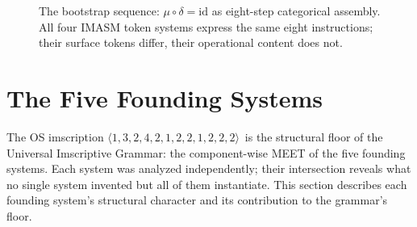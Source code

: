 \documentclass[12pt,a4paper]{article}
\newcommand{\UIG}{Universal Imscriptive Grammar}
\newcommand{\OS}{$\langle 1,3,2,4,2,1,2,2,1,2,2,2 \rangle$}
\begin{document}
\begin{figure}[htbp]
\caption{The bootstrap sequence: $\mu \circ \delta = \mathrm{id}$ as eight-step categorical assembly. All four IMASM token systems express the same eight instructions; their surface tokens differ, their operational content does not.}
\label{fig:bootstrap}
\end{figure}

\section{The Five Founding Systems}
\label{sec:founding}

The OS imscription \OS\ is the structural floor of the \UIG: the component-wise MEET of the five founding systems. Each system was analyzed independently; their intersection reveals what no single system invented but all of them instantiate. This section describes each founding system's structural character and its contribution to the grammar's floor.
\end{document}
